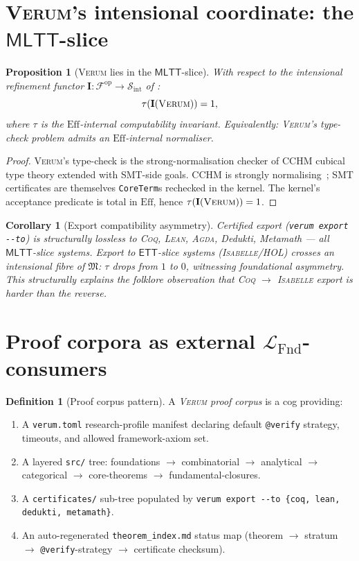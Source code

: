\documentclass[11pt, a4paper]{article}
\newtheorem{proposition}[theorem]{Proposition}
\newtheorem{corollary}[theorem]{Corollary}
\theoremstyle{definition}
\newtheorem{definition}[theorem]{Definition}
\theoremstyle{remark}
\newcommand{\cS}{\mathcal{S}}
\newcommand{\cF}{\mathcal{F}}
\newcommand{\fM}{\mathfrak{M}}
\newcommand{\LFnd}{\mathcal{L}_{\mathrm{Fnd}}}
\newcommand{\Sint}{\cS_{\mathrm{int}}}
\newcommand{\MLTT}{\mathsf{MLTT}}
\newcommand{\ETT}{\mathsf{ETT}}
\newcommand{\II}{\mathbf{I}}
\newcommand{\Eff}{\ensuremath{\mathrm{Eff}}}
\newcommand{\Verum}{\textsc{Verum}}
\newcommand{\Coq}{\textsc{Coq}}
\newcommand{\Lean}{\textsc{Lean}}
\newcommand{\Agda}{\textsc{Agda}}
\newcommand{\Isabelle}{\textsc{Isabelle}}
\begin{document}
\section{\Verum{}'s intensional coordinate: the $\MLTT$-slice}
\label{sec:mltt-ett}

\begin{proposition}[\Verum{} lies in the $\MLTT$-slice]
\label{prop:verum-in-mltt-slice}
With respect to the intensional refinement functor $\II : \cF^{\mathrm{op}} \to \Sint$ of \cite[Theorem \texttt{thm:I-existence}]{Sereda2026MSFS}:
\[
\tau(\II(\Verum)) = 1,
\]
where $\tau$ is the \Eff{}-internal computability invariant. Equivalently: \Verum{}'s type-check problem admits an \Eff{}-internal normaliser.
\end{proposition}

\begin{proof}
\Verum{}'s type-check is the strong-normalisation checker of CCHM cubical type theory extended with SMT-side goals. CCHM is strongly normalising~\cite{Huber2019}; SMT certificates are themselves \texttt{CoreTerm}s rechecked in the kernel. The kernel's acceptance predicate is total in $\Eff$, hence $\tau(\II(\Verum)) = 1$.
\end{proof}

\begin{corollary}[Export compatibility asymmetry]
\label{cor:export-compat}
Certified export (\verb|verum export --to|) is structurally lossless to \Coq, \Lean, \Agda, Dedukti, Metamath --- all $\MLTT$-slice systems. Export to $\ETT$-slice systems (\Isabelle/HOL) crosses an intensional fibre of $\fM$: $\tau$ drops from $1$ to $0$, witnessing foundational asymmetry. This structurally explains the folklore observation that \Coq{} $\to$ \Isabelle{} export is harder than the reverse.
\end{corollary}

\section{Proof corpora as external $\LFnd$-consumers}
\label{sec:corpora}

\begin{definition}[Proof corpus pattern]
\label{def:corpus-pattern}
A \emph{\Verum{} proof corpus} is a cog providing:
\begin{enumerate}[nosep]
\item A \texttt{verum.toml} research-profile manifest declaring default \texttt{@verify} strategy, timeouts, and allowed framework-axiom set.
\item A layered \texttt{src/} tree: foundations $\to$ combinatorial $\to$ analytical $\to$ categorical $\to$ core-theorems $\to$ fundamental-closures.
\item A \texttt{certificates/} sub-tree populated by \verb|verum export --to {coq, lean, dedukti, metamath}|.
\item An auto-regenerated \texttt{theorem\_index.md} status map (theorem $\to$ stratum $\to$ \texttt{@verify}-strategy $\to$ certificate checksum).
\end{enumerate}
\end{definition}
\end{document}
